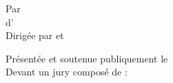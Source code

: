 \begin{center}
\bigskip \bigskip

\large{Par {\auteur}} \\
\medskip
\large{{\diplome} d'\discipline} \\
\medskip 
\large{Dirigée par {\directeurA} et {\directeurB}} \\

\bigskip\bigskip

\normalsize{Présentée et soutenue publiquement le \PhDdate} \\
\normalsize{Devant un jury composé de :} \\

\NewDocumentCommand{}
\NewDocumentCommand{}
    
\begin{table}[h!]
\centering
\small
\Comite{\juryP}{\juryRA}{\juryRB}{\juryEA}{\juryEB}{\juryDA}{\juryDB}
\end{table}
\bigskip\bigskip
\end{center}
\restoregeometry

